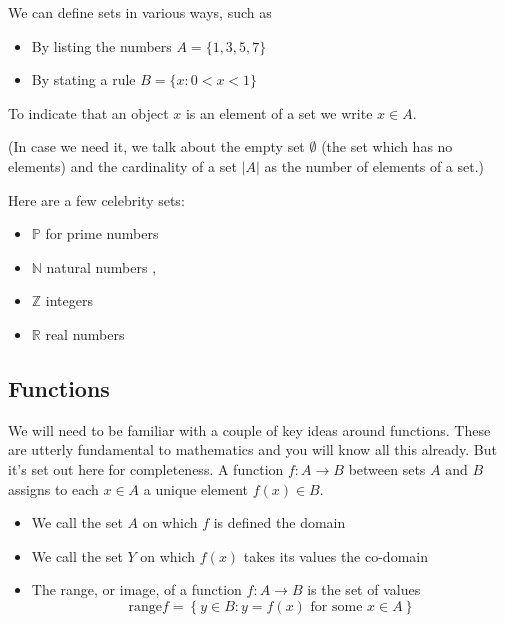 \documentclass[12pt]{extbook}
\begin{document}
We can define sets in various ways, such as 

\begin{itemize}
\item By listing the numbers $A=\{1,3,5,7\}$
\item By stating a rule $B=\{ x:0 < x < 1\}$
\end{itemize}


To indicate that an object $x$ is an element of a set we write $x \in A$.

(In case we need it, we talk about the empty set $\emptyset$ (the set which has no elements) and the cardinality of a set $|A|$ as the number of elements of a set.)


Here are a few celebrity sets:

\begin{itemize}
\item $\mathbb{P}$ for prime numbers
\item $\mathbb{N}$ natural numbers ,
\item $\mathbb{Z}$ integers 
\item $\mathbb{R}$  real numbers
\end{itemize}


\subsection{Functions}

We will need to be familiar with a couple of key ideas around functions.   These are utterly fundamental to mathematics and you will know all this already.   But it's set out here for completeness.   A function $f: A \to B$ between sets $A$ and $B$ assigns to each $x \in A$ a unique element $f(x) \in B$.   

\begin{itemize}
\item We call the set $A$ on which $f$ is defined the domain
\item We call the set $Y$ on which $f(x)$ takes its values the co-domain
\item The range, or image, of a function $f : A \to B$ is the set of values 
\begin{displaymath}
\mbox{range} f= \left\{ y \in B : y=f(x) \mbox{ for some } x \in A \right\}
\end{displaymath}
\end{itemize}
\end{document}
